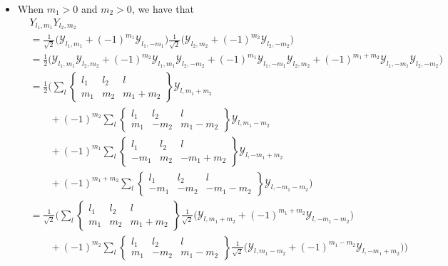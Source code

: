 \documentclass[10pt]{article}
\begin{document}
\begin{itemize}
		\item When $m_1 > 0$  and $m_2 > 0$, we have that
		\begin{align*}
			& Y_{l_1, m_1} Y_{l_2, m_2}\\
			&= \frac{1}{\sqrt{2}} \bigg( \mathcal{Y}_{l_1, m_1} + (-1)^{m_1} \mathcal{Y}_{l_1, -m_1} \bigg) \frac{1}{\sqrt{2}} \bigg( \mathcal{Y}_{l_2, m_2} + (-1)^{m_2} \mathcal{Y}_{l_2, -m_2} \bigg) \\
			&= \frac{1}{2} \bigg( 
			\mathcal{Y}_{l_1, m_1}\mathcal{Y}_{l_2, m_2}
			+ (-1)^{m_2} \mathcal{Y}_{l_1, m_1}\mathcal{Y}_{l_2, -m_2} 
			+ (-1)^{m_1} \mathcal{Y}_{l_1, -m_1}\mathcal{Y}_{l_2, m_2} 
			+ (-1)^{m_1+m_2} \mathcal{Y}_{l_1, -m_1}\mathcal{Y}_{l_2, -m_2}
			\bigg) \\
			&= \frac{1}{2} \bigg( 
			\sum_{l} \begin{Bmatrix} l_1 & l_2 & l \\ m_1 & m_2 & m_1 + m_2 \end{Bmatrix} \mathcal{Y}_{l, m_1+m_2} \\
			&\qquad + (-1)^{m_2} \sum_{l} \begin{Bmatrix} l_1 & l_2 & l \\ m_1 & -m_2 & m_1 - m_2 \end{Bmatrix} \mathcal{Y}_{l, m_1-m_2} \\
			&\qquad + (-1)^{m_1} \sum_{l} \begin{Bmatrix} l_1 & l_2 & l \\ -m_1 & m_2 & -m_1 + m_2 \end{Bmatrix} \mathcal{Y}_{l, -m_1+m_2} \\
			&\qquad + (-1)^{m_1+m_2} \sum_{l} \begin{Bmatrix} l_1 & l_2 & l \\ -m_1 & -m_2 & -m_1 - m_2 \end{Bmatrix} \mathcal{Y}_{l, -m_1-m_2}
			\bigg) \\
			&= \frac{1}{\sqrt{2}} \bigg( 
			\sum_{l} \begin{Bmatrix} l_1 & l_2 & l \\ m_1 & m_2 & m_1 + m_2 \end{Bmatrix} \frac{1}{\sqrt{2}} \bigg( \mathcal{Y}_{l, m_1+m_2} + (-1)^{m_1+m_2} \mathcal{Y}_{l, -m_1-m_2} \bigg)  \\
			&\qquad + (-1)^{m_2} \sum_{l} \begin{Bmatrix} l_1 & l_2 & l \\ m_1 & -m_2 & m_1 - m_2 \end{Bmatrix} \frac{1}{\sqrt{2}} \bigg(  \mathcal{Y}_{l, m_1-m_2} + (-1)^{m_1-m_2} \mathcal{Y}_{l, -m_1+m_2} \bigg) \bigg) \\

\end{align*}
\end{itemize}
\end{document}
